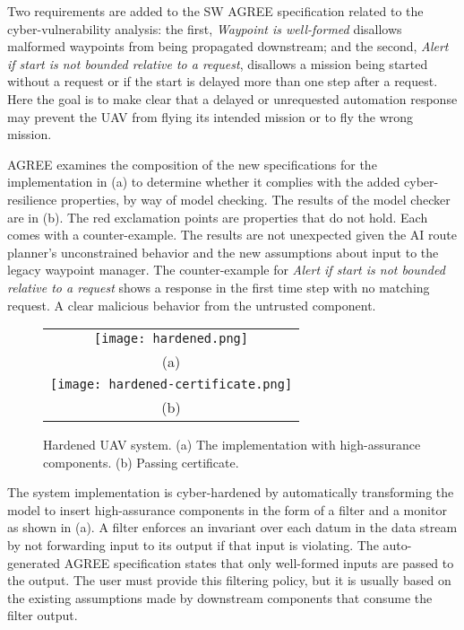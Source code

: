 Two requirements are added to the SW AGREE specification related to the cyber-vulnerability analysis: the first, \emph{Waypoint is well-formed} disallows malformed waypoints from being propagated downstream; and the second, \emph{Alert if start is not bounded relative to a request}, disallows a mission being started without a request or if the start is delayed more than one step after a request. Here the goal is to make clear that a delayed or unrequested automation response may prevent the UAV from flying its intended mission or to fly the wrong mission. 

AGREE examines the composition of the new specifications for the implementation in (a) to determine whether it complies with the added cyber-resilience properties, by way of model checking. The results of the model checker are in (b). The red exclamation points are properties that do not hold. Each comes with a counter-example. The results are not unexpected given the AI route planner's unconstrained behavior and the new assumptions about input to the legacy waypoint manager. The counter-example for \emph{Alert if start is not bounded relative to a request} shows a response in the first time step with no matching request. A clear malicious behavior from the untrusted component.

\begin{figure*}
  \begin{center}
    \begin{tabular}{c}
      \texttt{[image: hardened.png]} \\
      (a) \\
      \texttt{[image: hardened-certificate.png]} \\
      (b)
    \end{tabular}
  \end{center}
  \caption{Hardened UAV system. (a) The implementation with high-assurance components. (b) Passing certificate.}
  \label{fig:hardened}
\end{figure*}

The system implementation is cyber-hardened by automatically transforming the model to insert high-assurance components in the form of a filter and a monitor as shown in (a). A filter enforces an invariant over each datum in the data stream by not forwarding input to its output if that input is violating. The auto-generated AGREE specification states that only well-formed inputs are passed to the output. The user must provide this filtering policy, but it is usually based on the existing assumptions made by downstream components that consume the filter output. 

